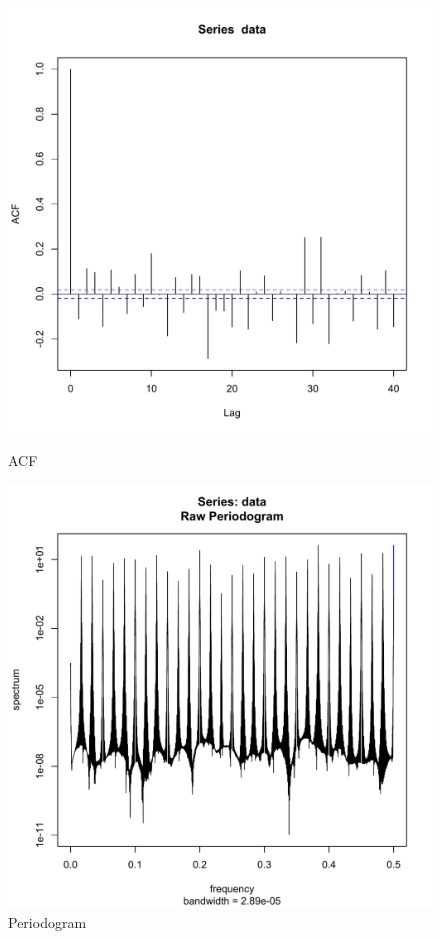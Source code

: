 \documentclass[11pt]{article}
\begin{document}
\begin{figure}[ht]
\begin{minipage}[b]{0.45\linewidth}
\centering
\includegraphics[scale=.42]{a4564acf.pdf}
\caption{ACF}
\label{fig:figure3}
\end{minipage}
\begin{minipage}[b]{0.45\linewidth}
\centering
\includegraphics[scale=.42]{a4564pgram.pdf}
\caption{Periodogram}
\label{fig:figure4}
\end{minipage}
\end{figure}
\end{document}
